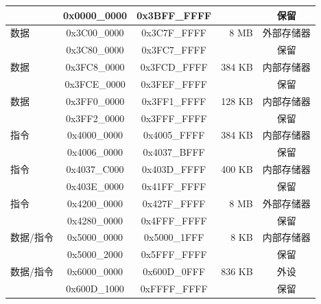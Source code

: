 \begin{longtable}[c]{|p{4cm}|c|c|r|c|}
    \rowcolor{gray!25}              & 0x0000\_0000 & 0x3BFF\_FFFF &         & 保留          \\\hline
                        数据        & 0x3C00\_0000 & 0x3C7F\_FFFF &    8 MB & 外部存储器    \\\hline
    \rowcolor{gray!25}              & 0x3C80\_0000 & 0x3FC7\_FFFF &         & 保留          \\\hline
                        数据        & 0x3FC8\_0000 & 0x3FCD\_FFFF &  384 KB & 内部存储器    \\\hline
    \rowcolor{gray!25}              & 0x3FCE\_0000 & 0x3FEF\_FFFF &         & 保留          \\\hline
                        数据        & 0x3FF0\_0000 & 0x3FF1\_FFFF &  128 KB & 内部存储器    \\\hline
    \rowcolor{gray!25}              & 0x3FF2\_0000 & 0x3FFF\_FFFF &         & 保留          \\\hline
                        指令        & 0x4000\_0000 & 0x4005\_FFFF &  384 KB & 内部存储器    \\\hline
    \rowcolor{gray!25}              & 0x4006\_0000 & 0x4037\_BFFF &         & 保留          \\\hline
                        指令        & 0x4037\_C000 & 0x403D\_FFFF &  400 KB & 内部存储器    \\\hline
    \rowcolor{gray!25}              & 0x403E\_0000 & 0x41FF\_FFFF &         & 保留          \\\hline
                        指令        & 0x4200\_0000 & 0x427F\_FFFF &    8 MB & 外部存储器    \\\hline
    \rowcolor{gray!25}              & 0x4280\_0000 & 0x4FFF\_FFFF &         & 保留          \\\hline
                        数据/指令   & 0x5000\_0000 & 0x5000\_1FFF &    8 KB & 内部存储器    \\\hline
    \rowcolor{gray!25}              & 0x5000\_2000 & 0x5FFF\_FFFF &         & 保留          \\\hline
                         数据/指令  & 0x6000\_0000 & 0x600D\_0FFF &  836 KB & 外设          \\\hline
    \rowcolor{gray!25}              & 0x600D\_1000 & 0xFFFF\_FFFF &         & 保留          \\\hline

\end{longtable}
